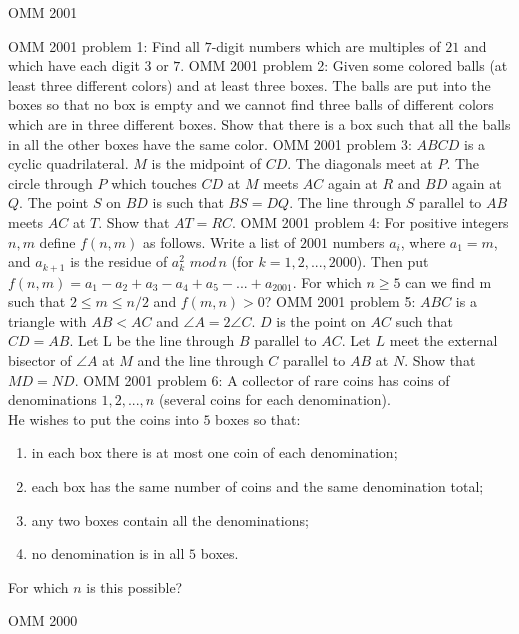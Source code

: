 OMM 2001 

OMM 2001 problem 1:  Find all $7$-digit numbers which are multiples of $21$ and which have each digit $3$ or $7$. 
OMM 2001 problem 2:  Given some colored balls (at least three different colors) and at least three boxes. The balls are put into the boxes so that no box is empty and we cannot find three balls of different colors which are in three different boxes. Show that there is a box such that all the balls in all the other boxes have the same color. 
OMM 2001 problem 3:  $ABCD$ is a cyclic quadrilateral. $M$ is the midpoint of $CD$. The diagonals meet at $P$. The circle through $P$ which touches $CD$ at $M$ meets $AC$ again at $R$ and $BD$ again at $Q$. The point $S$ on $BD$ is such that $BS = DQ$. The line through $S$ parallel to $AB$ meets $AC$ at $T$. Show that $AT = RC$. 
OMM 2001 problem 4:  For positive integers $n, m$ define $f(n,m)$ as follows. Write a list of $ 2001$ numbers $a_i$, where $a_1 = m$, and $a_{k+1}$ is the residue of $a_k^2$ $mod \, n$ (for $k = 1, 2,..., 2000$). Then put $f(n,m) = a_1-a_2 + a_3 -a_4 + a_5- ... + a_{2001}$. For which $n \ge 5$ can we find m such that $2 \le  m \le n/2$ and $f(m,n) > 0$? 
OMM 2001 problem 5:  $ABC$ is a triangle with $AB < AC$ and $\angle A = 2 \angle C$. $D$ is the point on $AC$ such that $CD = AB$. Let L be the line through $B$ parallel to $AC$. Let $L$ meet the external bisector of $\angle A$ at $M$ and the line through $C$ parallel to $AB$ at $N$. Show that $MD = ND$. 
OMM 2001 problem 6:  A collector of rare coins has coins of denominations $1, 2,..., n$ (several coins for each denomination). \\
He wishes to put the coins into $5$ boxes so that:
\begin{enumerate}[(1)]
  \item in each box there is at most one coin of each denomination;
  \item each box has the same number of coins and the same denomination total;
  \item any two boxes contain all the denominations;
  \item no denomination is in all $5$ boxes.
\end{enumerate}
For which $n$ is this possible? 

OMM 2000 

